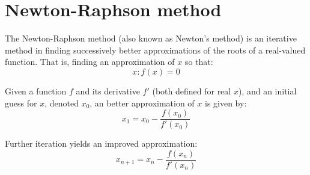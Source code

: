 \documentclass[english]{../thermomemo/thermomemo}
\numberwithin{equation}{section}
\begin{document}
\section{Newton-Raphson method}
\label{app:NewtRaps}
The Newton-Raphson method (also known as Newton's method) is an iterative method in finding successively better approximations of the roots of a real-valued function. That is, finding an approximation of $x$ so that:
\begin{equation}
x : f(x) = 0
\end{equation}

Given a function $f$ and its derivative $f'$ (both defined for real $x$), and an initial guess for $x$, denoted $x_0$, an better approximation of $x$ is given by:
\begin{equation}
x_1 = x_0 - \frac{f(x_0)}{f'(x_0)}
\end{equation}

Further iteration yields an improved approximation:
\begin{equation}
x_{n+1} = x_{n} - \frac{f(x_{n})}{f'(x_{n})}
\end{equation}
\end{document}
